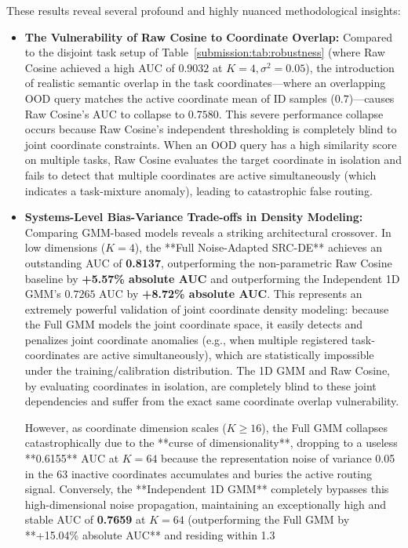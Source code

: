 These results reveal several profound and highly nuanced methodological insights:
\begin{itemize}
    \item {\bf The Vulnerability of Raw Cosine to Coordinate Overlap:} Compared to the disjoint task setup of Table~\ref{submission:tab:robustness} (where Raw Cosine achieved a high AUC of $0.9032$ at $K=4, \sigma^2=0.05$), the introduction of realistic semantic overlap in the task coordinates—where an overlapping OOD query matches the active coordinate mean of ID samples ($0.7$)—causes Raw Cosine's AUC to collapse to $0.7580$. This severe performance collapse occurs because Raw Cosine's independent thresholding is completely blind to joint coordinate constraints. When an OOD query has a high similarity score on multiple tasks, Raw Cosine evaluates the target coordinate in isolation and fails to detect that multiple coordinates are active simultaneously (which indicates a task-mixture anomaly), leading to catastrophic false routing.
    \item {\bf Systems-Level Bias-Variance Trade-offs in Density Modeling:} Comparing GMM-based models reveals a striking architectural crossover. In low dimensions ($K=4$), the **Full Noise-Adapted SRC-DE** achieves an outstanding AUC of {\bf 0.8137}, outperforming the non-parametric Raw Cosine baseline by {\bf +5.57\% absolute AUC} and outperforming the Independent 1D GMM's $0.7265$ AUC by {\bf +8.72\% absolute AUC}. This represents an extremely powerful validation of joint coordinate density modeling: because the Full GMM models the joint coordinate space, it easily detects and penalizes joint coordinate anomalies (e.g., when multiple registered task-coordinates are active simultaneously), which are statistically impossible under the training/calibration distribution. The 1D GMM and Raw Cosine, by evaluating coordinates in isolation, are completely blind to these joint dependencies and suffer from the exact same coordinate overlap vulnerability.
    
    However, as coordinate dimension scales ($K \ge 16$), the Full GMM collapses catastrophically due to the **curse of dimensionality**, dropping to a useless **0.6155** AUC at $K=64$ because the representation noise of variance 0.05 in the 63 inactive coordinates accumulates and buries the active routing signal. Conversely, the **Independent 1D GMM** completely bypasses this high-dimensional noise propagation, maintaining an exceptionally high and stable AUC of {\bf 0.7659} at $K=64$ (outperforming the Full GMM by **+15.04\% absolute AUC** and residing within 1.3%
\end{itemize}

